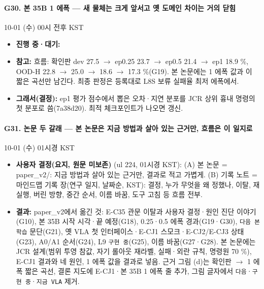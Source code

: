 \paragraph{G30. 본 35B 1 에폭 --- 새 물체는 크게 앞서고 옛 도메인 차이는 거의 닫힘}
{\small 10-01 (수) 00시 전후 KST}
\begin{itemize}
  \item \textbf{진행 중·대기:} 
  \item \textbf{참고:} 흐름: 확인판 dev 27.5 $\rightarrow$ ep0.25 23.7 $\rightarrow$ ep0.5 21.4 $\rightarrow$ ep1 18.9 \%, OOD-H 22.8 $\rightarrow$ 25.0 $\rightarrow$ 18.6 $\rightarrow$ 17.3 \%(G19). 본 논문에는 1 에폭 값과 이 짧은 곡선만 남긴다. 최종 판정은 등록대로 L8S 보류 실패율 최저 에폭에서.
  \item \textbf{그래서(결정):} ep1 평가 점수에서 뽑은 오차·지연 분포를 JCR 상위 흉내 명령의 첫 분포로 씀(7a38d20). 최적 체크포인트가 나오면 갱신.
\end{itemize}

\paragraph{G31. 논문 두 갈래 --- 본 논문은 지금 방법과 살아 있는 근거만, 흐름은 이 일지로}
{\small 10-01 (수) 01시경 KST}
\begin{itemize}
  \item \textbf{사용자 결정(요지, 원문 미보존)} (ul 224, 01시경 KST): (A) 본 논문 = paper\_v2/: 지금 방법과 살아 있는 근거만, 결과로 적고 가볍게. (B) 기록 노트 = 마인드맵 기록 장(연구 일지, 날짜순, KST): 결정, 누가 무엇을 왜 정했나, 이탈, 재실행, 버린 방향, 중간 순서, 이름 바꿈, 도구 고침 등 흐름 전부.
  \item \textbf{결과:} paper\_v2에서 옮긴 것: E-C35 관문 이탈과 사용자 결정·원인 진단 이야기(G10), 본 35B 시작 시각·끝 예정(G18), 0.25·0.5 에폭 경과(G19·G30), \texttt{다음 본 학습} 문단(G21), 옛 VLA 첫 인터페이스·E-CJ1 스모크·E-CJ2/E-CJ3 상태(G23), A0/A1 순서(G24), L9 \texttt{구현 중}(G25), 이름 바꿈(G27·G28). 본 논문에는 JCR 설계(범위 투영 참값, 자기 롤아웃 재라벨, 실패·외란 규칙, 명령원 70 \%), E-CJ1 결과와 네 원인, 1 에폭 값을 결과로 넣음. 근거 그림 (d)는 확인판 $\rightarrow$ 1 에폭 짧은 곡선, 결론 지도에 E-CJ1·본 35B 1 에폭 줄 추가, 그림 글자에서 \texttt{다음}·\texttt{구현 중}·\texttt{지금 VLA} 제거.
\end{itemize}

